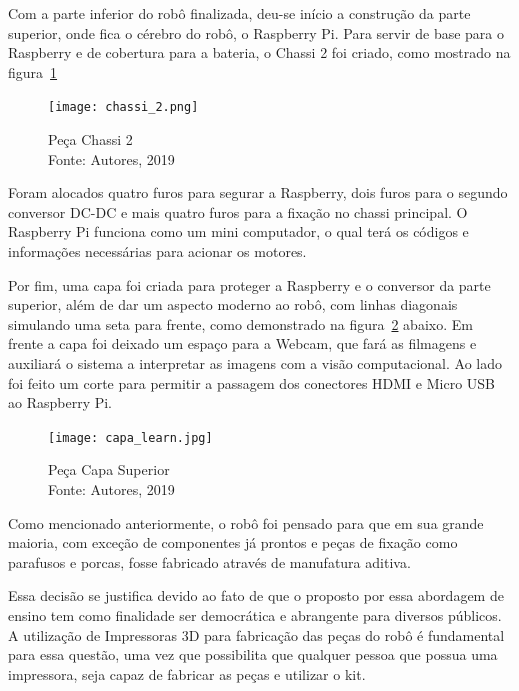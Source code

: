 Com a parte inferior do robô finalizada, deu-se início a construção da parte superior, onde fica o cérebro do robô, o Raspberry Pi. Para servir de base para o Raspberry e de cobertura para a bateria, o Chassi 2 foi criado, como mostrado na figura~\ref{fig:chassi_2}

\begin{figure}[h!]
	\centering
	\texttt{[image: chassi\_2.png]}\\
	\caption{Peça Chassi 2 \\ Fonte: Autores, 2019}
	\label{fig:chassi_2}
\end{figure}

Foram alocados quatro furos para segurar a Raspberry, dois furos para o segundo conversor DC-DC e mais quatro furos para a fixação no chassi principal. O Raspberry Pi funciona como um mini computador, o qual terá os códigos e informações necessárias para acionar os
motores.

Por fim, uma capa foi criada para proteger a Raspberry e o conversor da parte superior, além de dar um aspecto moderno ao robô, com linhas diagonais simulando uma seta para frente, como demonstrado na figura~\ref{fig:capa_learn} abaixo. Em frente a capa foi deixado um espaço para a Webcam, que fará as filmagens e auxiliará o sistema a interpretar as imagens com a visão computacional. Ao lado foi feito um corte para permitir a passagem dos conectores HDMI e Micro USB ao Raspberry Pi.

\begin{figure}[h!]
	\centering
	\texttt{[image: capa\_learn.jpg]}\\
	\caption{Peça Capa Superior \\ Fonte: Autores, 2019}
	\label{fig:capa_learn}
\end{figure}

Como mencionado anteriormente, o robô foi pensado para que em sua grande maioria, com exceção de componentes já prontos e peças de fixação como parafusos e porcas, fosse fabricado através de manufatura aditiva.

Essa decisão se justifica devido ao fato de que o proposto por essa abordagem de ensino tem como finalidade ser democrática e abrangente para diversos públicos. A utilização de Impressoras 3D para fabricação das peças do robô é fundamental para essa questão, uma vez que possibilita que qualquer pessoa que possua uma impressora, seja capaz de fabricar as peças e utilizar o kit.

